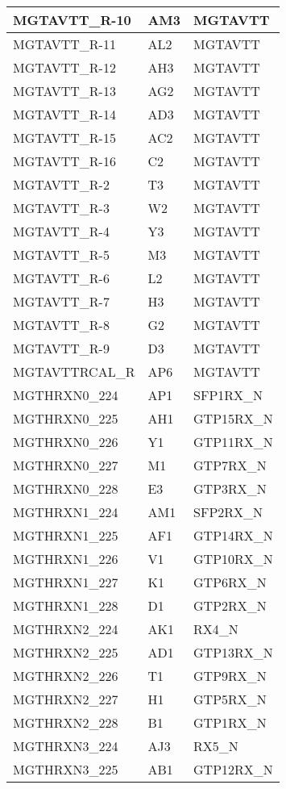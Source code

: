 \begin{footnotesize}
\begin{longtable}{|p{7cm}|p{1cm}|p{5cm}|}
MGTAVTT\_R-10	&	AM3	&	MGTAVTT	\\ \hline
MGTAVTT\_R-11	&	AL2	&	MGTAVTT	\\ \hline
MGTAVTT\_R-12	&	AH3	&	MGTAVTT	\\ \hline
MGTAVTT\_R-13	&	AG2	&	MGTAVTT	\\ \hline
MGTAVTT\_R-14	&	AD3	&	MGTAVTT	\\ \hline
MGTAVTT\_R-15	&	AC2	&	MGTAVTT	\\ \hline
MGTAVTT\_R-16	&	C2	&	MGTAVTT	\\ \hline
MGTAVTT\_R-2	&	T3	&	MGTAVTT	\\ \hline
MGTAVTT\_R-3	&	W2	&	MGTAVTT	\\ \hline
MGTAVTT\_R-4	&	Y3	&	MGTAVTT	\\ \hline
MGTAVTT\_R-5	&	M3	&	MGTAVTT	\\ \hline
MGTAVTT\_R-6	&	L2	&	MGTAVTT	\\ \hline
MGTAVTT\_R-7	&	H3	&	MGTAVTT	\\ \hline
MGTAVTT\_R-8	&	G2	&	MGTAVTT	\\ \hline
MGTAVTT\_R-9	&	D3	&	MGTAVTT	\\ \hline
MGTAVTTRCAL\_R	&	AP6	&	MGTAVTT	\\ \hline
MGTHRXN0\_224	&	AP1	&	SFP1RX\_N	\\ \hline
MGTHRXN0\_225	&	AH1	&	GTP15RX\_N	\\ \hline
MGTHRXN0\_226	&	Y1	&	GTP11RX\_N	\\ \hline
MGTHRXN0\_227	&	M1	&	GTP7RX\_N	\\ \hline
MGTHRXN0\_228	&	E3	&	GTP3RX\_N	\\ \hline
MGTHRXN1\_224	&	AM1	&	SFP2RX\_N	\\ \hline
MGTHRXN1\_225	&	AF1	&	GTP14RX\_N	\\ \hline
MGTHRXN1\_226	&	V1	&	GTP10RX\_N	\\ \hline
MGTHRXN1\_227	&	K1	&	GTP6RX\_N	\\ \hline
MGTHRXN1\_228	&	D1	&	GTP2RX\_N	\\ \hline
MGTHRXN2\_224	&	AK1	&	RX4\_N	\\ \hline
MGTHRXN2\_225	&	AD1	&	GTP13RX\_N	\\ \hline
MGTHRXN2\_226	&	T1	&	GTP9RX\_N	\\ \hline
MGTHRXN2\_227	&	H1	&	GTP5RX\_N	\\ \hline
MGTHRXN2\_228	&	B1	&	GTP1RX\_N	\\ \hline
MGTHRXN3\_224	&	AJ3	&	RX5\_N	\\ \hline
MGTHRXN3\_225	&	AB1	&	GTP12RX\_N	\\ \hline

\end{longtable}
\end{footnotesize}
